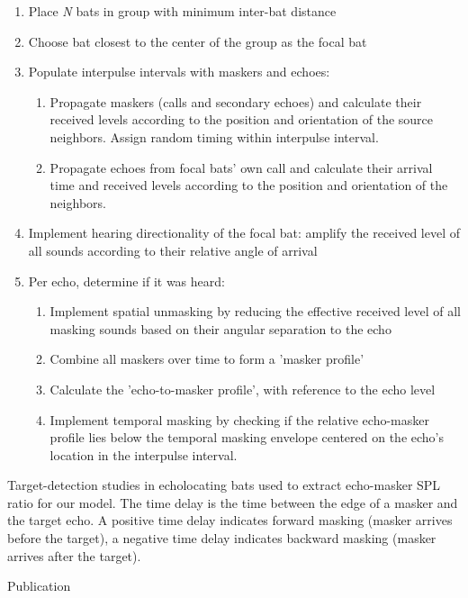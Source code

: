 \documentclass[
]{book}
\begin{document}
\begin{enumerate}
  \item Place \textit{N} bats in group with minimum inter-bat distance
  \item Choose bat closest to the center of the group as the focal bat
  \item Populate interpulse intervals with maskers and echoes:
    \begin{enumerate}
    \item Propagate maskers (calls and secondary echoes) and calculate their received levels according to the position and orientation of the source neighbors. Assign random timing within interpulse interval.
    \item Propagate echoes from focal bats' own call and calculate their arrival time and received levels according to the position and orientation of the neighbors.
    \end{enumerate}
  \item Implement hearing directionality of the focal bat: amplify the received level of all sounds according to their relative angle of arrival
  \item Per echo, determine if it was heard:
    \begin{enumerate}
      \item Implement spatial unmasking by reducing the effective received level of all masking sounds based on their angular separation to the echo
      \item Combine all maskers over time to form a 'masker profile'
      \item Calculate the 'echo-to-masker profile', with reference to the echo level
      \item Implement temporal masking by checking if the relative echo-masker profile lies below the temporal masking envelope centered on the echo's location in the interpulse interval.
    \end{enumerate}
\end{enumerate}

\newpage

\label{tab:maskingtable} Target-detection studies in echolocating bats used to extract echo-masker SPL ratio for our model. The time delay is the time between the edge of a masker and the target echo. A positive time delay indicates forward masking (masker arrives before the target), a negative time delay indicates backward masking (masker arrives after the target).

Publication
\end{document}
